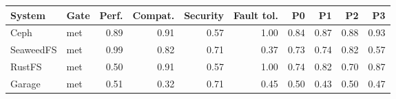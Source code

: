 \begin{tabular}{@{}llrrrrrrrr@{}}
\toprule
System & Gate & Perf. & Compat. & Security & Fault tol. & P0 & P1 & P2 & P3 \\
\midrule
Ceph & met & 0.89 & 0.91 & 0.57 & 1.00 & 0.84 & 0.87 & 0.88 & 0.93 \\
SeaweedFS & met & 0.99 & 0.82 & 0.71 & 0.37 & 0.73 & 0.74 & 0.82 & 0.57 \\
RustFS & met & 0.50 & 0.91 & 0.57 & 1.00 & 0.74 & 0.82 & 0.70 & 0.87 \\
Garage & met & 0.51 & 0.32 & 0.71 & 0.45 & 0.50 & 0.43 & 0.50 & 0.47 \\
\bottomrule
\end{tabular}
